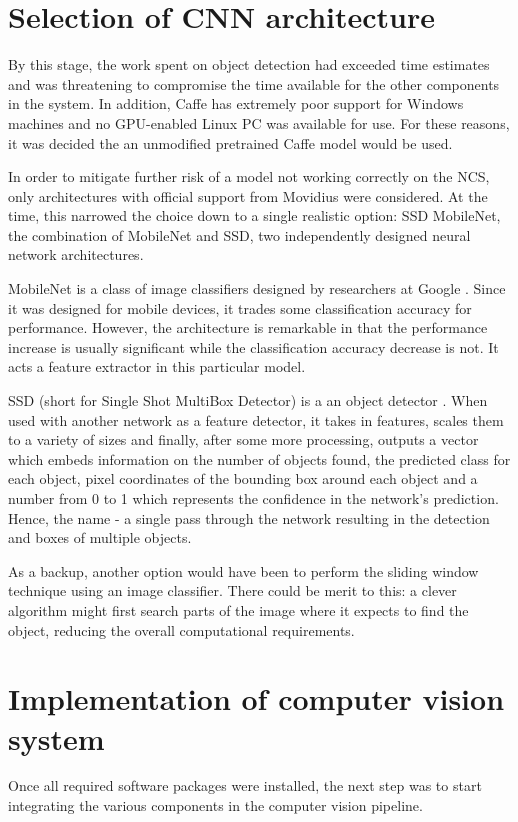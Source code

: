 \section{Selection of CNN architecture}
By this stage, the work spent on object detection had exceeded time estimates and was threatening to compromise the time available for the other components in the system. In addition, Caffe has extremely poor support for Windows machines and no GPU-enabled Linux PC was available for use. For these reasons, it was decided the an unmodified pretrained Caffe model would be used.

In order to mitigate further risk of a model not working correctly on the NCS, only architectures with official support from Movidius were considered. At the time, this narrowed the choice down to a single realistic option: SSD MobileNet, the combination of MobileNet and SSD, two independently designed neural network architectures.

MobileNet is a class of image classifiers designed by researchers at Google \cite{arXiv:1704.04861}. Since it was designed for mobile devices, it trades some classification accuracy for performance. However, the architecture is remarkable in that the performance increase is usually significant while the classification accuracy decrease is not. It acts a feature extractor in this particular model.

SSD (short for Single Shot MultiBox Detector) is a an object detector \cite{arXiv:1512.02325}. When used with another network as a feature detector, it takes in features, scales them to a variety of sizes and finally, after some more processing, outputs a vector which embeds information on the number of objects found, the predicted class for each object, pixel coordinates of the bounding box around each object and a number from 0 to 1 which represents the confidence in the network's prediction. Hence, the name - a single pass through the network resulting in the detection and boxes of multiple objects.

As a backup, another option would have been to perform the sliding window technique using an image classifier. There could be merit to this: a clever algorithm might first search parts of the image where it expects to find the object, reducing the overall computational requirements.


\section{Implementation of computer vision system}
Once all required software packages were installed, the next step was to start integrating the various components in the computer vision pipeline.

